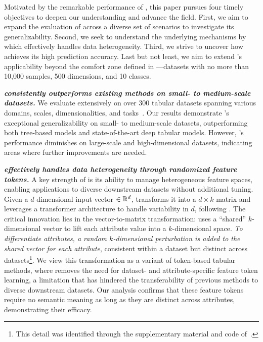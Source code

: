 Motivated by the remarkable performance of \ours, this paper pursues four timely objectives to deepen our understanding and advance the field.
First, we aim to expand the evaluation of \ours across a diverse set of scenarios to investigate its generalizability. Second, we seek to understand the underlying mechanisms by which \ours effectively handles data heterogeneity.
Third, we strive to uncover how \ours achieves its high prediction accuracy. Last but not least, we aim to extend \ours's applicability beyond the comfort zone defined in \citet{hollmann2025TabPFNv2}—datasets with no more than 10,000 samples, 500 dimensions, and 10 classes.

\noindent\textbf{\emph{\ours consistently outperforms existing methods on small- to medium-scale datasets.}} We evaluate \ours extensively on over 300 tabular datasets spanning various domains, scales, dimensionalities, and tasks~\cite{Grinsztajn2022Why,McElfreshKVCRGW23when,Ye2024Closer,Rubachev2024TabRed}. Our results demonstrate \ours's exceptional generalizability on small- to medium-scale datasets, outperforming both tree-based models and state-of-the-art deep tabular models. However, \ours's performance diminishes on large-scale and high-dimensional datasets, indicating areas where further improvements are needed.

\noindent\textbf{\emph{\ours effectively handles data heterogeneity through randomized feature tokens.}} A key strength of \ours is its ability to manage heterogeneous feature spaces, enabling applications to diverse downstream datasets without additional tuning.
Given a $d$-dimensional input vector $\in \mathbb{R}^d$, \ours transforms it into a $d \times k$ matrix and leverages a transformer architecture to handle variability in $d$, following \cite{SongS0DX0T19AutoInt,GorishniyRKB21Revisiting,Yan2024Making}.
The critical innovation lies in the vector-to-matrix transformation: \ours uses a ``shared'' $k$-dimensional vector to lift each attribute value into a $k$-dimensional space. \emph{To differentiate attributes, a random $k$-dimensional perturbation is added to the shared vector for each attribute}, consistent within a dataset but distinct across datasets\footnote{This detail was identified through the supplementary material and code of~\cite{hollmann2025TabPFNv2}.}.
We view this transformation as a variant of token-based tabular methods, where \ours removes the need for dataset- and attribute-specific feature token learning, a limitation that has hindered the transferability of previous methods to diverse downstream datasets.
Our analysis confirms that these feature tokens require no semantic meaning as long as they are distinct across attributes, demonstrating their efficacy.


